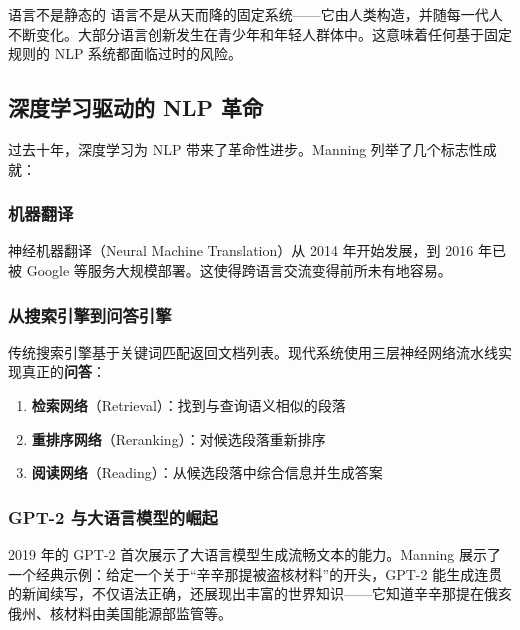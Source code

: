\documentclass[a4paper]{article}
\begin{document}
\begin{warningbox}{语言不是静态的}
语言不是从天而降的固定系统——它由人类构造，并随每一代人不断变化。大部分语言创新发生在青少年和年轻人群体中。这意味着任何基于固定规则的 NLP 系统都面临过时的风险。
\end{warningbox}

\subsection{深度学习驱动的 NLP 革命}

过去十年，深度学习为 NLP 带来了革命性进步。Manning 列举了几个标志性成就：

\subsubsection{机器翻译}

神经机器翻译（Neural Machine Translation）从 2014 年开始发展，到 2016 年已被 Google 等服务大规模部署。这使得跨语言交流变得前所未有地容易。





\subsubsection{从搜索引擎到问答引擎}

传统搜索引擎基于关键词匹配返回文档列表。现代系统使用三层神经网络流水线实现真正的\textbf{问答}：

\begin{enumerate}
    \item \textbf{检索网络}（Retrieval）：找到与查询语义相似的段落
    \item \textbf{重排序网络}（Reranking）：对候选段落重新排序
    \item \textbf{阅读网络}（Reading）：从候选段落中综合信息并生成答案
\end{enumerate}

\subsubsection{GPT-2 与大语言模型的崛起}

2019 年的 GPT-2 首次展示了大语言模型生成流畅文本的能力。Manning 展示了一个经典示例：给定一个关于``辛辛那提被盗核材料''的开头，GPT-2 能生成连贯的新闻续写，不仅语法正确，还展现出丰富的世界知识——它知道辛辛那提在俄亥俄州、核材料由美国能源部监管等。
\end{document}
